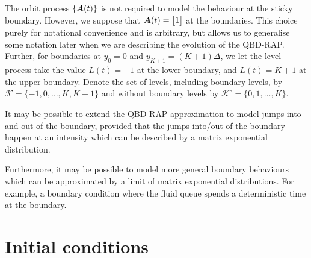 The orbit process \(\{\boldsymbol A(t)\}\) is not required to model the behaviour at the sticky boundary. However, we suppose that \(\boldsymbol A(t)=\begin{bmatrix} 1 \end{bmatrix}\) at the boundaries. This choice purely for notational convenience and is arbitrary, but allows us to generalise some notation later when we are describing the evolution of the QBD-RAP. Further, for boundaries at \(y_0=0\) and \(y_{K+1} = (K+1)\Delta\), we let the level process take the value \(L(t)=-1\) at the lower boundary, and \(L(t)=K+1\) at the upper boundary. Denote the set of levels, including boundary levels, by \(\mathcal K = \{-1,0,\dots,K,K+1\}\) and without boundary levels by \(\mathcal K^\circ=\{0,1,\dots,K\}\). 

\begin{rem}\label{rem: 111}
	It may be possible to extend the QBD-RAP approximation to model jumps into and out of the boundary, provided that the jumps into/out of the boundary happen at an intensity which can be described by a matrix exponential distribution. 
	
	Furthermore, it may be possible to model more general boundary behaviours which can be approximated by a limit of matrix exponential distributions. For example, a boundary condition where the fluid queue spends a deterministic time at the boundary. 
\end{rem}

\section{Initial conditions}\label{sec: initial conditions}

